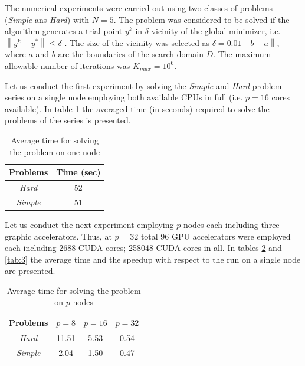 \documentclass[a4paper]{jpconf}
\begin{document}
The numerical experiments were carried out using two classes of problems 
(\textit{Simple} ans \textit{Hard}) with $N=5$. The problem was considered to 
be solved if the algorithm generates a trial point $y^k$ in $\delta$-vicinity 
of the global minimizer, i.e. $\left\|y^k-y^\ast\right\|\leq\delta$ . The 
size of the vicinity was selected as $\delta=0.01\left\|b-a\right\|$, where 
$a$ and $b$ are the boundaries of the search domain $D$. The maximum 
allowable number of iterations was $K_{max} = 10^6$.

Let us conduct the first experiment by solving the \textit{Simple} and \textit{Hard} problem 
series on a single node employing both available CPUs in full (i.e. $p=16$ 
cores available). In table \ref{tab:1} the averaged time (in seconds) 
required to solve the problems of the series is presented.

\begin{table}
\caption{Average time for solving the problem on one node}
\label{tab:1}
\begin{center}
\begin{tabular}{cc}
\hline
Problems & Time (sec) \\
\hline
\textit{Hard} & 52  \\
\textit{Simple} & 51 \\
\hline
\end{tabular}
\end{center}
\end{table}

Let us conduct the next experiment employing $p$ nodes each including three 
graphic accelerators. Thus, at $p=32$ total 96 GPU accelerators were employed 
each including 2688 CUDA cores; 258048 CUDA cores in all. In tables \ref{tab:2} and \ref{tab:3} the average time and the speedup with respect to the run 
on a single node are presented.

\begin{table}
\caption{Average time for solving the problem on $p$ nodes}
\label{tab:2}
\begin{center}
\begin{tabular}{cccc}
\hline
Problems & $p = 8$ & $p=16$ & $p=32$ \\
\hline
\textit{Hard} & 11.51 & 5.53 & 0.54 \\
\textit{Simple} & 2.04 & 1.50 & 0.47\\
\hline
\end{tabular}
\end{center}
\end{table}
\end{document}
